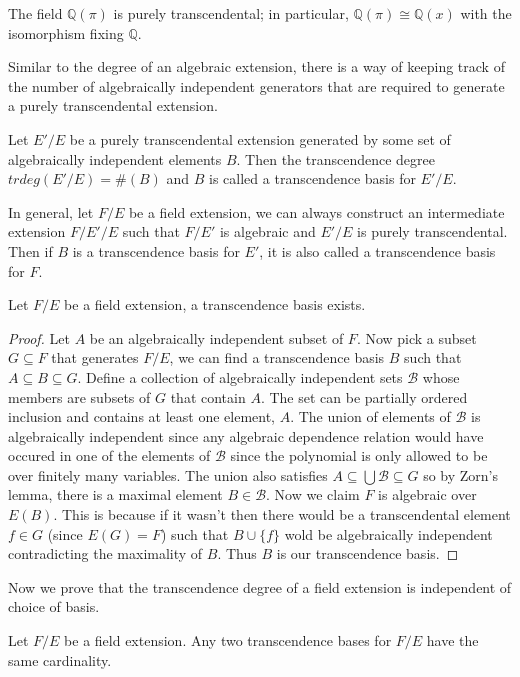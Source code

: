 \begin{example} The field $\mathbb{Q}(\pi)$ is purely transcendental; in
particular, $\mathbb{Q}(\pi)\cong\mathbb{Q}(x)$ with the isomorphism fixing
$\mathbb{Q}$. \end{example}
Similar to the degree of an algebraic extension, there is a way of keeping track
of the number of algebraically independent generators that are required to
generate a purely transcendental extension.
\begin{definition} Let $E'/E$ be a purely transcendental extension generated by
some set of algebraically independent elements $B$. Then the transcendence
degree $trdeg(E'/E)=\#(B)$ and $B$ is called a transcendence basis for $E'/E$.
\end{definition}
In general, let $F/E$ be a field extension, we can always construct an
intermediate extension $F/E'/E$ such that $F/E'$ is algebraic and $E'/E$ is
purely transcendental. Then if $B$ is a transcendence basis for $E'$, it is also
called a transcendence basis for $F$.
\begin{theorem} Let $F/E$ be a field extension, a transcendence basis exists.
\end{theorem}
\begin{proof} Let $A$ be an algebraically independent subset of $F$. Now pick a
subset $G\subseteq F$ that generates $F/E$, we can find a transcendence basis
$B$ such that $A\subseteq B\subseteq G$. Define a collection of algebraically
independent sets $\mathcal{B}$ whose members are subsets of $G$ that contain
$A$. The set can be partially ordered inclusion and contains at least one
element, $A$. The union of elements of $\mathcal{B}$ is algebraically
independent since any algebraic dependence relation would have occured in one of
the elements of $\mathcal{B}$ since the polynomial is only allowed to be over
finitely many variables. The union also satisfies $A\subseteq
\bigcup\mathcal{B}\subseteq G$ so by Zorn's lemma, there is a maximal element
$B\in\mathcal{B}$. Now we claim $F$ is algebraic over $E(B)$. This is because if
it wasn't then there would be a transcendental element $f\in G$ (since $E(G)=F$)
such that $B\cup\{f\}$ wold be algebraically independent contradicting the
maximality of $B$. Thus $B$ is our transcendence basis. \end{proof}
Now we prove that the transcendence degree of a field extension is independent of choice of basis.
\begin{theorem} Let $F/E$ be a field extension. Any two transcendence bases for $F/E$ have the same cardinality. \end{theorem}
